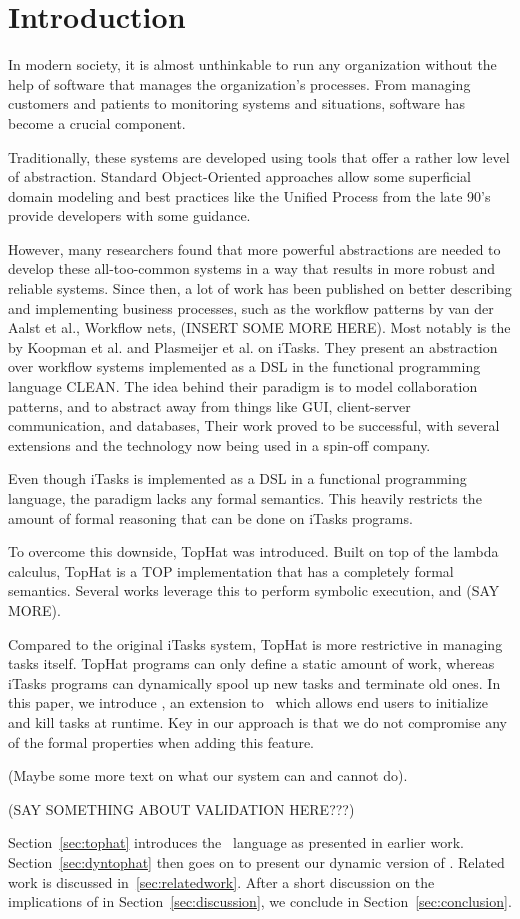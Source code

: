 
\section{Introduction}
\label{sec:introduction}

In modern society, it is almost unthinkable to run any organization without the help of software that manages the organization's processes.
From managing customers and patients to monitoring systems and situations, software has become a crucial component.

Traditionally, these systems are developed using tools that offer a rather low level of abstraction.
Standard Object-Oriented approaches allow some superficial domain modeling and best practices like the Unified Process from the late 90's provide developers with some guidance.

However, many researchers found that more powerful abstractions are needed to develop these all-too-common systems in a way that results in more robust and reliable systems.
Since then, a lot of work has been published on better describing and implementing business processes, such as the workflow patterns by van der Aalst et al., Workflow nets, (INSERT SOME MORE HERE).
Most notably is the by Koopman et al. and Plasmeijer et al. on iTasks.
They present an abstraction over workflow systems implemented as a DSL in the functional programming language CLEAN.
The idea behind their paradigm is to model collaboration patterns, and to abstract away from things like GUI, client-server communication, and databases, 
Their work proved to be successful, with several extensions and the technology now being used in a spin-off company.

Even though iTasks is implemented as a DSL in a functional programming language, the paradigm lacks any formal semantics.
This heavily restricts the amount of formal reasoning that can be done on iTasks programs.

To overcome this downside, TopHat was introduced.
Built on top of the lambda calculus, TopHat is a TOP implementation that has a completely formal semantics.
Several works leverage this to perform symbolic execution, and (SAY MORE).

Compared to the original iTasks system, TopHat is more restrictive in managing tasks itself.
TopHat programs can only define a static amount of work, whereas iTasks programs can dynamically spool up new tasks and terminate old ones.
In this paper, we introduce \DYNTOPHAT, an extension to \TOPHAT\ which allows end users to initialize and kill tasks at runtime.
Key in our approach is that we do not compromise any of the formal properties when adding this feature.

(Maybe some more text on what our system can and cannot do).

(SAY SOMETHING ABOUT VALIDATION HERE???)

Section~\ref{sec:tophat} introduces the \TOPHAT\ language as presented in earlier work. Section~\ref{sec:dyntophat} then goes on to present our dynamic version of \TOPHAT.
Related work is discussed in~\ref{sec:relatedwork}. After a short discussion on the implications of \DYNTOPHAT in Section~\ref{sec:discussion}, we conclude in Section~\ref{sec:conclusion}.